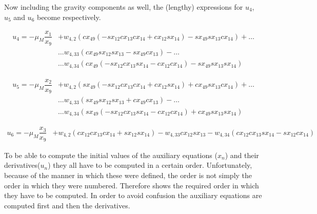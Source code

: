 Now including the gravity components as well, the (lengthy) expressions for $u_{4}$, $u_{5}$ and $u_{6}$ become  respectively.

\begin{equation} \label{eq:u4Com}
\begin{split}
u_{4}= -\mu_{M}\dfrac{x_{1}}{x_{9}}&+w_{4,2} \left( cx_{49}\left(-sx_{12} cx_{13} cx_{14} +cx_{12} sx_{14} \right)-sx_{49} sx_{13} cx_{14} \right)+ \dots \\
& \dotsc  w_{4,33} \left( cx_{49} sx_{12} sx_{13} -sx_{49} cx_{13}\right)-\dots \\
& \dotsc w_{4,34} \left( cx_{49}\left(-sx_{12} cx_{13} sx_{14} -cx_{12} cx_{14} \right)-sx_{49} sx_{13} sx_{14} \right)
\end{split}
\end{equation}

\begin{equation} \label{eq:u5Com}
\begin{split}
u_{5}= -\mu_{M}\dfrac{x_{2}}{x_{9}}&+w_{4,2} \left( sx_{49}\left(-sx_{12} cx_{13} cx_{14} +cx_{12} sx_{14} \right)+cx_{49} sx_{13} cx_{14}  \right)+ \dots \\
& \dotsc w_{4,33} \left( sx_{49} sx_{12} sx_{13} +cx_{49} cx_{13} \right)- \dots \\
& \dotsc w_{4,34} \left(sx_{49}\left(-sx_{12} cx_{13} sx_{14} -cx_{12} cx_{14} \right)+cx_{49} sx_{13} sx_{14} \right)
\end{split}
\end{equation} 

\begin{equation} \label{eq:u6Com}
\begin{split}
u_{6}= -\mu_{M}\dfrac{x_{3}}{x_{9}}&+w_{4,2} \left(cx_{12} cx_{13} cx_{14} +sx_{12} sx_{14}  \right)  - w_{4,33}cx_{12} sx_{13}  -w_{4,34} \left( cx_{12} cx_{13} sx_{14} -sx_{12} cx_{14} \right)
\end{split}
\end{equation}

 
%

To be able to compute the initial values of the auxiliary equations ($x_{n}$) and their derivatives($u_{n}$) they all have to be computed in a certain order. Unfortunately, because of the manner in which these were defined, the order is not simply the order in which they were numbered. Therefore  shows the required order in which they have to be computed. In order to avoid confusion the auxiliary equations are computed first and then the derivatives.

